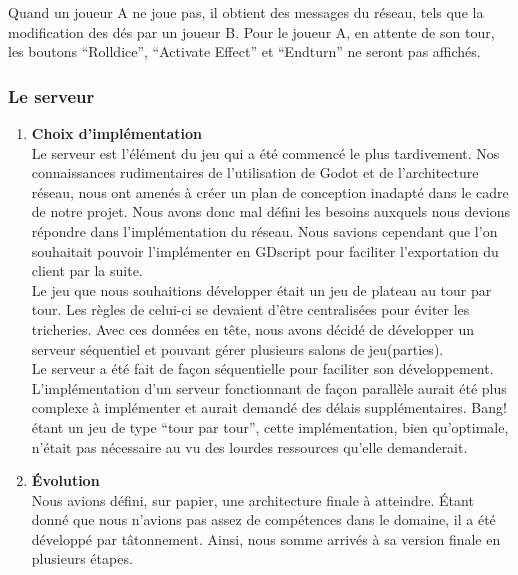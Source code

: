 \documentclass[a4paper,11pt]{article}
\begin{document}
    Quand un joueur A ne joue pas, il obtient des messages du réseau, tels que la modification des dés par un joueur B. Pour le joueur A, en attente de son tour, les boutons “Rolldice”, “Activate Effect” et “Endturn” ne seront pas affichés.


\subsubsection{Le serveur}

\begin{enumerate}
	\item \textbf{Choix d'implémentation} \\
	
	Le serveur est l’élément du jeu qui a été commencé le plus tardivement. Nos connaissances rudimentaires de l’utilisation de Godot et de l’architecture réseau, nous ont amenés à créer un plan de conception inadapté dans le cadre de notre projet. Nous avons donc mal défini les besoins auxquels nous devions répondre dans l’implémentation du réseau. Nous savions cependant que l’on souhaitait pouvoir l'implémenter en GDscript pour faciliter l’exportation du client par la suite. \\
	
    Le jeu que nous souhaitions développer était un jeu de plateau au tour par tour. Les règles de celui-ci se devaient d'être centralisées pour éviter les tricheries. Avec ces données en tête, nous avons décidé de développer un serveur séquentiel et pouvant gérer plusieurs salons de jeu(parties).  \\

    Le serveur a été fait de façon séquentielle pour faciliter son développement. L’implémentation d’un serveur fonctionnant de façon parallèle aurait été plus complexe à implémenter et aurait demandé des délais supplémentaires. Bang! étant un jeu de type “tour par tour”, cette implémentation, bien qu'optimale, n’était pas nécessaire au vu des lourdes ressources qu’elle demanderait. \\

	
	\item \textbf{Évolution} \\
	
	Nous avions défini, sur papier, une architecture finale à atteindre. Étant donné que nous n’avions pas assez de compétences dans le domaine, il a été développé par tâtonnement. Ainsi, nous somme arrivés à sa version finale en plusieurs étapes. \\
	

\end{enumerate}
\end{document}
